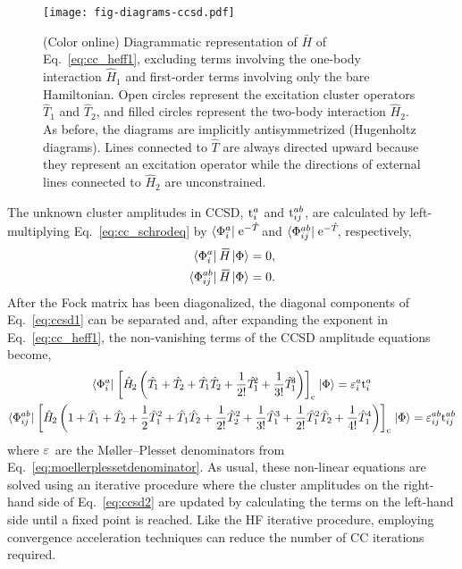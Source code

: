 \documentclass[thesis.tex]{subfiles}
\begin{document}
\begin{figure}
  \texttt{[image: fig-diagrams-ccsd.pdf]}
  \caption{(Color online) Diagrammatic representation of $\bar{H}$ of Eq.\ \eqref{eq:cc_heff1}, excluding terms involving the one-body interaction $\hat{H}_1$ and first-order terms involving only the bare Hamiltonian. Open circles represent the excitation cluster operators $\hat{T}_1$ and $\hat{T}_2$, and filled circles represent the two-body interaction $\hat{H}_2$.  As before, the diagrams are implicitly antisymmetrized (Hugenholtz diagrams).  Lines connected to $\hat{T}$ are always directed upward because they represent an excitation operator while the directions of external lines connected to $\hat{H}_2$ are unconstrained. }
  \label{fig:diagrams-ccsd}
\end{figure}

The unknown cluster amplitudes in CCSD, $\text{t}^{a}_{i}$ and $\text{t}^{ab}_{ij}$, are calculated by left-multiplying Eq.\ \eqref{eq:cc_schrodeq} by $\langle \Phi^{a}_{i} |\hspace{1pt} \operatorname{e}^{-\hat{T}\hspace{-2pt}}$ and $\langle \Phi^{ab}_{ij} |\hspace{1pt} \operatorname{e}^{-\hat{T}\hspace{-2pt}}$, respectively,
\begin{align} \label{eq:ccsd1}
  \statebra{a}{i} \EHam \refket &= 0, \\
  \statebra{ab}{ij} \EHam \refket &= 0. \notag
\end{align}
After the Fock matrix has been diagonalized, the diagonal components of Eq.\ \eqref{eq:ccsd1} can be separated and, after expanding the exponent in Eq.\ \eqref{eq:cc_heff1}, the non-vanishing terms of the CCSD amplitude equations become,
\begin{gather} \label{eq:ccsd2}
  \langle \Phi^{a}_{i} |\hspace{1pt} \left[ \hat{H}\hspace{-1.5pt}_{2} \left(\hat{T}\hspace{-2pt}_{1} + \hat{T}\hspace{-2pt}_{2} + \hat{T}\hspace{-2pt}_{1}\hat{T}\hspace{-2pt}_{2} + \frac{1}{2!} \hat{T}\hspace{-2pt}_{1}^{2} + \frac{1}{3!} \hat{T}\hspace{-2pt}_{1}^{3}\right) \right]_{\mathrm{c}} \hspace{1pt}| \Phi \rangle = \varepsilon^{a}_{i}\text{t}^{a}_{i} \\
  \langle \Phi^{ab}_{ij} |\hspace{1pt} \left[ \hat{H}\hspace{-1.5pt}_{2} \left(1 + \hat{T}_1 + \hat{T}_2 + \frac{1}{2} \hat{T}_1^{2} + \hat{T}_1\hat{T}_2 + \frac{1}{2!} \hat{T}_2^{2} + \frac{1}{3!} \hat{T}_1^{3} + \frac{1}{2!} \hat{T}_1^{2} \hat{T}_2 + \frac{1}{4!} \hat{T}_1^{4}\right) \right]_{\mathrm{c}} \hspace{1pt}| \Phi \rangle = \varepsilon^{ab}_{ij}\text{t}^{ab}_{ij} \notag
\end{gather}
where $\varepsilon^{}_{}$ are the M\o ller--Plesset denominators from Eq.\ \eqref{eq:moellerplessetdenominator}.  As usual, these non-linear equations are solved using an iterative procedure where the cluster amplitudes on the right-hand side of Eq.\ \eqref{eq:ccsd2} are updated by calculating the terms on the left-hand side until a fixed point is reached.  Like the HF iterative procedure, employing convergence acceleration techniques can reduce the number of CC iterations required.
\end{document}
